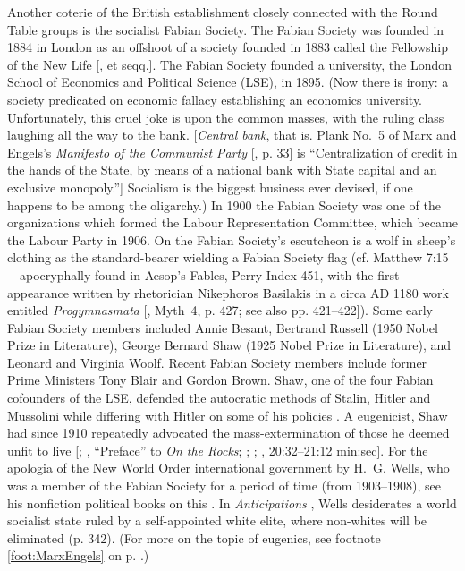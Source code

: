 \documentclass[letterpaper,12pt]{article}
\begin{document}
{    Another coterie of the British establishment closely connected with the Round Table groups is the socialist Fabian Society. The Fabian Society was founded in 1884 in London as an offshoot of a society founded in 1883 called the Fellowship of the New Life [, et seqq.]. The Fabian Society founded a university, the London School of Economics and Political Science (LSE), in 1895. (Now there is irony: a society predicated on economic fallacy establishing an economics university. Unfortunately, this cruel joke is upon the common masses, with the ruling class laughing all the way to the bank. [\emph{Central bank}, that is. Plank No.~5 of Marx and Engels's \emph{Manifesto of the Communist Party} [, p. 33] is ``Centralization of credit in the hands of the State, by means of a national bank with State capital and an exclusive monopoly.''] Socialism is the biggest business ever devised, if one happens to be among the oligarchy.) In 1900 the Fabian Society was one of the organizations which formed the Labour Representation Committee, which became the Labour Party in 1906. On the Fabian Society's escutcheon is a wolf in sheep's clothing as the standard-bearer wielding a Fabian Society flag (cf. Matthew 7:15---apocryphally found in Aesop's Fables, Perry Index 451, with the first appearance written by rhetorician Nikephoros Basilakis in a circa AD 1180 work entitled \emph{Progymnasmata} [, Myth~4, p. 427; see also pp. 421--422]). Some early Fabian Society members included Annie Besant, Bertrand Russell (1950 Nobel Prize in Literature), George Bernard Shaw (1925 Nobel Prize in Literature), and Leonard and Virginia Woolf. Recent Fabian Society members include former Prime Ministers Tony Blair and Gordon Brown. \label{page:ShawWells} Shaw, one of the four Fabian cofounders of the LSE, defended the autocratic methods of Stalin, Hitler and Mussolini while differing with Hitler on some of his policies \cite{NYT1933-12-10}. A eugenicist, Shaw had since 1910 repeatedly advocated the mass-extermination of those he deemed unfit to live [; , ``Preface'' to \emph{On the Rocks}; ; ; , 20:32--21:12 min:sec]. For the apologia of the New World Order international government by H.~G. Wells, who was a member of the Fabian Society for a period of time (from 1903--1908), see his nonfiction political books on this \cite{Wells1902,Wells1928,Wells1940}. In \emph{Anticipations} \cite{Wells1902}, Wells desiderates a world socialist state ruled by a self-appointed white elite, where non-whites will be eliminated (p. 342). (For more on the topic of eugenics, see footnote \ref{foot:MarxEngels} on p. \pageref{page:Eugenics}.)\par
}
\end{document}
